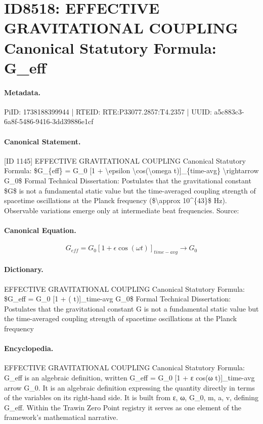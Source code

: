 \section*{ID8518: EFFECTIVE GRAVITATIONAL COUPLING Canonical Statutory Formula: G\_eff}
\paragraph{Metadata.}
PiID: 1738188399944 | RTEID: RTE:P33077.2857:T4.2357 | UUID: a5c883c3-6a8f-5486-9416-3dd39886e1cf

\paragraph{Canonical Statement.}
[ID 1145] EFFECTIVE GRAVITATIONAL COUPLING Canonical Statutory Formula: \$G\_\{eff\} = G\_0 [1 + \textbackslash{}epsilon \textbackslash{}cos(\textbackslash{}omega t)]\_\{time-avg\} \textbackslash{}rightarrow G\_0\$ Formal Technical Dissertation: Postulates that the gravitational constant \$G\$ is not a fundamental static value but the time-averaged coupling strength of spacetime oscillations at the Planck frequency (\$\textbackslash{}approx 10\textasciicircum{}\{43\}\$ Hz). Observable variations emerge only at intermediate beat frequencies. Source:

\paragraph{Canonical Equation.}
\[
G_{eff} = G_0 [1 + \epsilon \cos(\omega t)]_{time-avg} \rightarrow G_0
\]

\paragraph{Dictionary.}
EFFECTIVE GRAVITATIONAL COUPLING Canonical Statutory Formula: \$G\_eff = G\_0 [1 + ( t)]\_time-avg G\_0\$ Formal Technical Dissertation: Postulates that the gravitational constant G is not a fundamental static value but the time-averaged coupling strength of spacetime oscillations at the Planck frequency

\paragraph{Encyclopedia.}
EFFECTIVE GRAVITATIONAL COUPLING Canonical Statutory Formula: G\_eff is an algebraic definition, written G\_eff = G\_0 [1 + ε cos(ω t)]\_time-avg arrow G\_0. It is an algebraic definition expressing the quantity directly in terms of the variables on its right-hand side. It is built from ε, ω, G\_0, m, a, v, defining G\_eff. Within the Trawin Zero Point registry it serves as one element of the framework's mathematical narrative.
